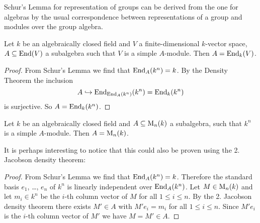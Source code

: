 \begin{rem}
  Schur’s Lemma for representation of groups can be derived from the one for algebras by the usual correspondence between representations of a group and modules over the group algebra.
\end{rem}


\begin{cor}
  Let $k$ be an algebraically closed field and $V$ a finite-dimensional $k$-vector space, $A \subseteq \operatorname{End}(V)$ a subalgebra such that $V$ is a simple $A$-module. Then $A = \operatorname{End}_k(V)$.
\end{cor}
\begin{proof}
  From Schur’s Lemma we find that $\operatorname{End}_A(k^n) = k$. By the Density Theorem the inclusion
  \[
    A \hookrightarrow \operatorname{End}_{\operatorname{End}_A(k^n)}(k^n) = \operatorname{End}_k(k^n)
  \]
  is surjective. So $A = \operatorname{End}_k(k^n)$.
\end{proof}



\begin{cor}
  Let $k$ be an algebraically closed field and $A \subseteq \operatorname{M}_n(k)$ a subalgebra, such that $k^n$ is a simple $A$-module. Then $A = \operatorname{M}_n(k)$.
\end{cor}


It is perhaps interesting to notice that this could also be proven using the 2. Jacobson density theorem:


\begin{proof}
  From Schur’s Lemma we find that $\operatorname{End}_A(k^n) = k$. Therefore the standard basis $e_1$, \dots, $e_n$ of $k^n$ is linearly independent over $\operatorname{End}_A(k^n)$. Let $M \in \operatorname{M}_n(k)$ and let $m_i \in k^n$ be the $i$-th column vector of $M$ for all $1 \leq i \leq n$. By the 2. Jacobson density theorem there exists $M' \in A$ with $M' e_i = m_i$ for all $1 \leq i \leq n$. Since $M' e_i$ is the $i$-th column vector of $M'$ we have $M = M' \in A$.
\end{proof}


